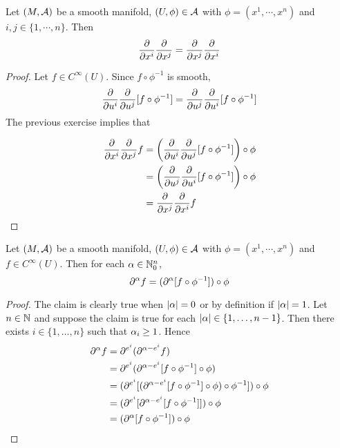 \documentclass{book}
\begin{document}
	\begin{ex}
	Let $(M, \mathcal{A})$ be a smooth manifold, $(U, \phi) \in \mathcal{A}$ with $\phi = (x^1, \cdots, x^n)$ and $i,j \in \{1, \cdots, n\}$. Then 
	\begin{equation*}
	\frac{\partial}{\partial x^i}\frac{\partial}{\partial x^j} =\frac{\partial}{\partial x^j}\frac{\partial}{\partial x^i}
	\end{equation*}
	\end{ex}
	
	\begin{proof}
	Let $f \in C^{\infty}(U)$. Since $f \circ \phi^{-1}$ is smooth, $$\frac{\partial}{\partial u^i} \frac{\partial}{\partial u^j} [f \circ \phi^{-1}] = \frac{\partial}{\partial u^j} \frac{\partial}{\partial u^i} [f \circ \phi^{-1}] $$
	The previous exercise implies that 
	
	\begin{align*}
	\frac{\partial}{\partial x^i}\frac{\partial}{\partial x^j}f 
	&= \bigg( \frac{\partial}{\partial u^i} \frac{\partial}{\partial u^j} [f \circ \phi^{-1}]  \bigg) \circ \phi \\
	&= \bigg( \frac{\partial}{\partial u^j} \frac{\partial}{\partial u^i} [f \circ \phi^{-1}]  \bigg) \circ \phi \\
	&=\frac{\partial}{\partial x^j}\frac{\partial}{\partial x^i}f 
	\end{align*}
	\end{proof}
	
	\begin{ex}
	Let $(M, \mathcal{A})$ be a smooth manifold, $(U, \phi) \in \mathcal{A}$ with $\phi = (x^1, \cdots, x^n)$ and $f \in C^{\infty}(U)$. Then for each $\alpha \in \mathbb{N}_0^n$, $$\partial^{\alpha} f = (\partial^{\alpha}[ f \circ \phi^{-1}] ) \circ \phi$$
	\end{ex}	
	
	\begin{proof}
	The claim is clearly true when $|\alpha| =0$ or by definition if $|\alpha| = 1$. Let $n \in \mathbb{N}$ and suppose the claim is true for each $|\alpha| \in \{1, \ldots, n-1 \}$. Then there exists $i \in \{1, \ldots, n\}$ such that $\alpha_i \geq 1$. Hence 
	\begin{align*}
	\partial^{\alpha}f 
	&= \partial^{e^i} (\partial^{\alpha - e^i} f) \\
	&= \partial^{e^i} (\partial^{\alpha - e^i}[ f \circ \phi^{-1}] \circ \phi) \\
	&= (\partial^{e^i} [(\partial^{\alpha - e^i}[ f \circ \phi^{-1}] \circ \phi) \circ \phi^{-1} ]) \circ \phi\\
	&= (\partial^{e^i} [\partial^{\alpha - e^i}[ f \circ \phi^{-1}]] )\circ \phi\\
	&= (\partial^{\alpha}[ f \circ \phi^{-1}] )\circ \phi\\
	\end{align*}
	\end{proof}
	
\end{document}
